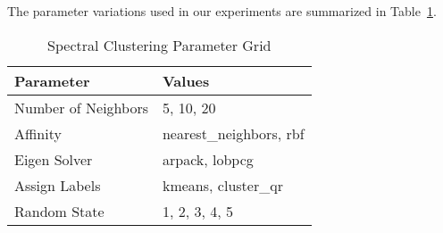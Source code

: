 The parameter variations used in our experiments are summarized in Table~\ref{tab:spectral-param-grid}.

\begin{table}[ht]
\centering
\caption{Spectral Clustering Parameter Grid}
\label{tab:spectral-param-grid}
\begin{tabularx}{\columnwidth}{|X|X|}
\hline
\textbf{Parameter} & \textbf{Values} \\ \hline
Number of Neighbors & 5, 10, 20 \\ \hline
Affinity & nearest\_neighbors, rbf \\ \hline
Eigen Solver & arpack, lobpcg \\ \hline
Assign Labels & kmeans, cluster\_qr \\ \hline
Random State & 1, 2, 3, 4, 5 \\ \hline
\end{tabularx}
\end{table}
